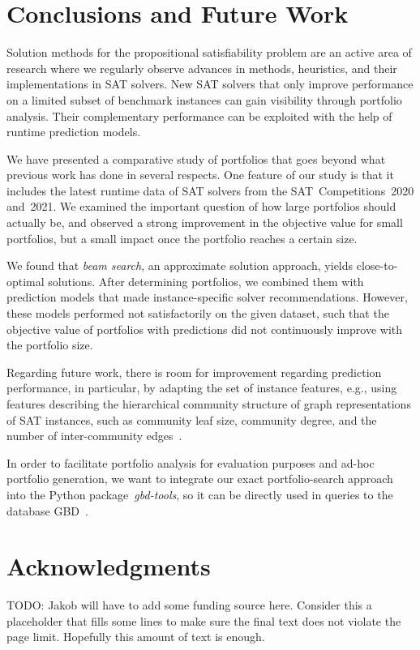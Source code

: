 \documentclass[conference]{IEEEtran}
\newcommand{\todo}[1]{{\color{red}TODO: #1}}
\begin{document}
\section{Conclusions and Future Work}
\label{sec:conclusion}

Solution methods for the propositional satisfiability problem are an active area of research where we regularly observe advances in methods, heuristics, and their implementations in SAT solvers. 
New SAT solvers that only improve performance on a limited subset of benchmark instances can gain visibility through portfolio analysis. 
Their complementary performance can be exploited with the help of runtime prediction models. 

We have presented a comparative study of portfolios that goes beyond what previous work has done in several respects.
One feature of our study is that it includes the latest runtime data of SAT solvers from the SAT~Competitions~2020 and~2021. 
We examined the important question of how large portfolios should actually be, and observed a strong improvement in the objective value for small portfolios, but a small impact once the portfolio reaches a certain size.

We found that \emph{beam search}, an approximate solution approach, yields close-to-optimal solutions.
After determining portfolios, we combined them with prediction models that made instance-specific solver recommendations.
However, these models performed not satisfactorily on the given dataset, such that the objective value of portfolios with predictions did not continuously improve with the portfolio size.

Regarding future work, there is room for improvement regarding prediction performance, in particular, by adapting the set of instance features,
e.g., using features describing the hierarchical community structure of graph representations of SAT instances, such as community leaf size, community degree, and the number of inter-community edges~\cite{Li:2021:HCS}. 

In order to facilitate portfolio analysis for evaluation purposes and ad-hoc portfolio generation, we want to integrate our exact portfolio-search approach into the Python package~\emph{gbd-tools}, so it can be directly used in queries to the database GBD~\cite{iser2020collaborative}. 

\section*{Acknowledgments}

\todo{Jakob will have to add some funding source here. Consider this a placeholder that fills some lines to make sure the final text does not violate the page limit. Hopefully this amount of text is enough.}

\balance %



\end{document}
